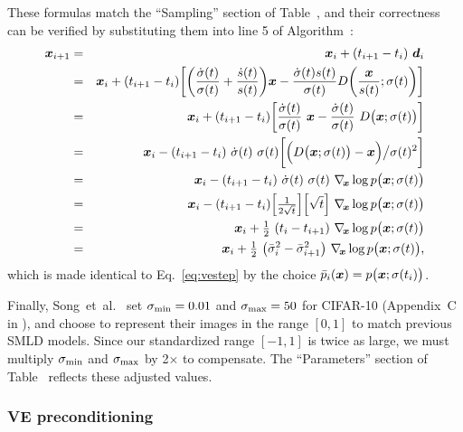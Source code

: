 These formulas match the ``Sampling'' section of Table~, and their correctness can be verified by substituting them into line 5 of Algorithm~:
\begin{eqnarray}
  \boldsymbol{x}_{i+1} &=& \boldsymbol{x}_i + (t_{i+1} - t_i) ~\boldsymbol{d}_i \\
  &=& \boldsymbol{x}_i + (t_{i+1} - t_i) \bigg[ \bigg( \frac{\dot\sigma(t)}{\sigma(t)} + \frac{\dot s(t)}{s(t)} \bigg) \boldsymbol{x} - \frac{\dot\sigma(t) s(t)}{\sigma(t)} D \bigg( \frac{\boldsymbol{x}}{s(t)}; \sigma(t) \bigg) \bigg] \\
  &=& \boldsymbol{x}_i + (t_{i+1} - t_i) \bigg[ \frac{\dot\sigma(t)}{\sigma(t)} ~\boldsymbol{x} - \frac{\dot\sigma(t)}{\sigma(t)} ~D \big( \boldsymbol{x}; \sigma(t) \big) \bigg] \\
  &=& \boldsymbol{x}_i - (t_{i+1} - t_i) ~\dot\sigma(t) ~\sigma(t) \bigg[ \Big( D \big( \boldsymbol{x}; \sigma(t) \big) - \boldsymbol{x} \Big) \big/ \sigma(t)^2 \bigg] \\
  &=& \boldsymbol{x}_i - (t_{i+1} - t_i) ~\dot\sigma(t) ~\sigma(t) ~\nabla_{\hspace{-0.5mm}\boldsymbol{x}} \log p\big( \boldsymbol{x}; \sigma(t) \big) \\
  &=& \boldsymbol{x}_i - (t_{i+1} - t_i) \Big[ \tfrac{1}{2\sqrt{t}} \Big] \Big[ \sqrt{t} \Big] ~\nabla_{\hspace{-0.5mm}\boldsymbol{x}} \log p\big( \boldsymbol{x}; \sigma(t) \big) \\
  &=& \boldsymbol{x}_i + \tfrac{1}{2} ~(t_i - t_{i+1}) ~\nabla_{\hspace{-0.5mm}\boldsymbol{x}} \log p\big( \boldsymbol{x}; \sigma(t) \big) \\
  &=& \boldsymbol{x}_i + \tfrac{1}{2} ~\big( \bar\sigma_i^2 - \bar\sigma_{i+1}^2 \big) ~\nabla_{\hspace{-0.5mm}\boldsymbol{x}} \log p\big( \boldsymbol{x}; \sigma(t) \big)
  \text{,}
\end{eqnarray}
which is made identical to Eq.~\ref{eq:vestep} by the choice $\bar p_i(\boldsymbol{x}) = p\big( \boldsymbol{x}; \sigma(t_i) \big)$.

Finally, Song~et~al.~\cite{Song2021sde} set $\smin = 0.01$ and $\smax = 50$ for CIFAR-10 (Appendix~C in \cite{Song2021sde}), and choose to represent their images in the range $[0, 1]$ to match previous SMLD models.
Since our standardized range $[-1, 1]$ is twice as large, we must multiply $\smin$ and $\smax$ by 2$\times$ to compensate.
The ``Parameters'' section of Table~ reflects these adjusted values.

\subsubsection{VE preconditioning}

